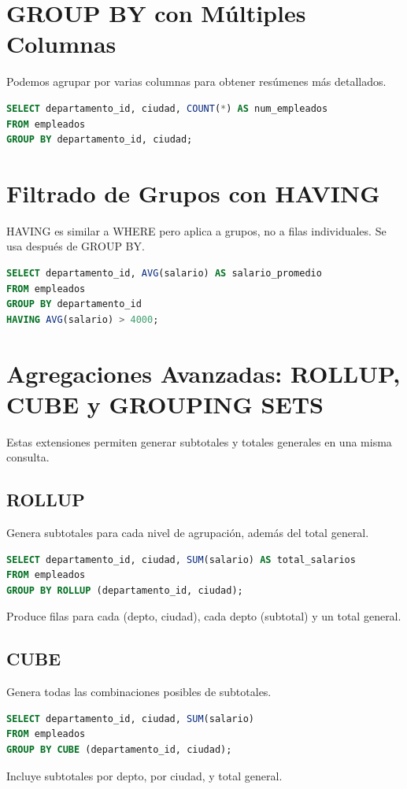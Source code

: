 \documentclass[12pt,a4paper,openany,oneside]{book}
\begin{document}
\section{GROUP BY con Múltiples Columnas}
Podemos agrupar por varias columnas para obtener resúmenes más detallados.
\begin{lstlisting}[language=SQL]
SELECT departamento_id, ciudad, COUNT(*) AS num_empleados
FROM empleados
GROUP BY departamento_id, ciudad;
\end{lstlisting}

\section{Filtrado de Grupos con HAVING}
HAVING es similar a WHERE pero aplica a grupos, no a filas individuales. Se usa después de GROUP BY.
\begin{lstlisting}[language=SQL]
SELECT departamento_id, AVG(salario) AS salario_promedio
FROM empleados
GROUP BY departamento_id
HAVING AVG(salario) > 4000;
\end{lstlisting}

\section{Agregaciones Avanzadas: ROLLUP, CUBE y GROUPING SETS}
Estas extensiones permiten generar subtotales y totales generales en una misma consulta.

\subsection{ROLLUP}
Genera subtotales para cada nivel de agrupación, además del total general.
\begin{lstlisting}[language=SQL]
SELECT departamento_id, ciudad, SUM(salario) AS total_salarios
FROM empleados
GROUP BY ROLLUP (departamento_id, ciudad);
\end{lstlisting}
Produce filas para cada (depto, ciudad), cada depto (subtotal) y un total general.

\subsection{CUBE}
Genera todas las combinaciones posibles de subtotales.
\begin{lstlisting}[language=SQL]
SELECT departamento_id, ciudad, SUM(salario)
FROM empleados
GROUP BY CUBE (departamento_id, ciudad);
\end{lstlisting}
Incluye subtotales por depto, por ciudad, y total general.
\end{document}
